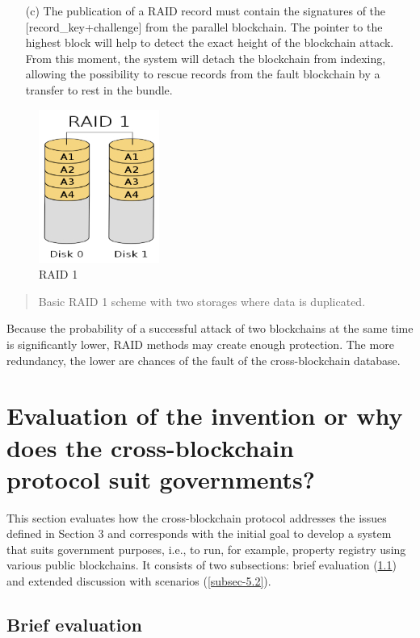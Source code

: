 \begin{multicols}{2}
\begin{itemize}
\item[(c)] The publication of a RAID record must contain the signatures of the [record\_key+challenge] from the parallel blockchain. The pointer to the highest block will help to detect the exact height of the blockchain attack. From this moment, the system will detach the blockchain from indexing, allowing the possibility to rescue records from the fault blockchain by a transfer to rest in the bundle.
\end{itemize}
\begin{figure}[H]
\centering
\includegraphics[scale=3]{src/Figures/chap1/chap1-fig06.jpg}
\caption{RAID 1}\label{chap1-fig06}
\end{figure}

\begin{quote}
Basic RAID 1 scheme with two storages where data is duplicated.
\end{quote}

Because the probability of a successful attack of two blockchains at the same time is significantly lower, RAID methods may create enough protection. The more redundancy, the lower are chances of the fault of the cross-blockchain database.

\section{Evaluation of the invention or why does the cross-blockchain\\ protocol suit governments?}\label{sec-5}

This section evaluates how the cross-blockchain protocol addresses the issues defined in Section 3 and corresponds with the initial goal to develop a system that suits government purposes, i.e., to run, for example, property registry using various public blockchains. It consists of two subsections: brief evaluation (\ref{subsec-5.1}) and extended discussion with scenarios (\ref{subsec-5.2}).

\subsection{Brief evaluation}\label{subsec-5.1}


\end{multicols}

